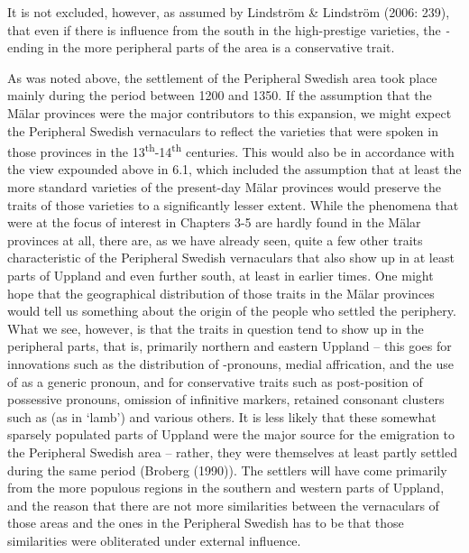 It is not excluded, however, as assumed by Lindström \& Lindström (2006: 239), that even if there is influence from the south in the high-prestige varieties, the\textit{ {}-} ending in the more peripheral parts of the area is a conservative trait.

As was noted above, the settlement of the Peripheral Swedish area took place mainly during the period between 1200 and 1350. If the assumption that the Mälar provinces were the major contributors to this expansion, we might expect the Peripheral Swedish vernaculars to reflect the varieties that were spoken in those provinces in the 13\textsuperscript{th}{}-14\textsuperscript{th} centuries. This would also be in accordance with the view expounded above in 6.1, which included the assumption that at least the more standard varieties of the present-day Mälar provinces would preserve the traits of those varieties to a significantly lesser extent. While the phenomena that were at the focus of interest in Chapters 3{}-5 are hardly found in the Mälar provinces at all, there are, as we have already seen, quite a few other traits characteristic of the Peripheral Swedish vernaculars that also show up in at least parts of Uppland and even further south, at least in earlier times. One might hope that the geographical distribution of those traits in the Mälar provinces would tell us something about the origin of the people who settled the periphery. What we see, however, is that the traits in question tend to show up in the peripheral parts, that is, primarily northern and eastern Uppland – this goes for innovations such as the distribution of -pronouns, medial affrication, and the use of  as a generic pronoun, and for conservative traits such as post-position of possessive pronouns, omission of infinitive markers, retained consonant clusters such as (as in ‘lamb’)\textit{ }and various others. It is less likely that these somewhat sparsely populated parts of Uppland were the major source for the emigration to the Peripheral Swedish area – rather, they were themselves at least partly settled during the same period (Broberg (1990)). The settlers will have come primarily from the more populous regions in the southern and western parts of Uppland, and the reason that there are not more similarities between the vernaculars of those areas and the ones in the Peripheral Swedish has to be that those similarities were obliterated under external influence. 

